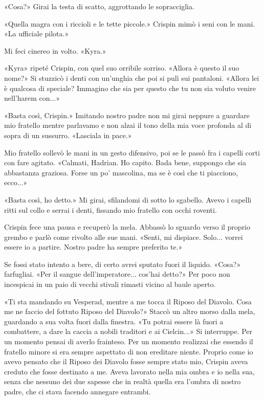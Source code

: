 «Cosa?» Girai la testa di scatto, aggrottando le sopracciglia.

«Quella magra con i riccioli e le tette piccole.» Crispin mimò i seni
con le mani. «La ufficiale pilota.»

Mi feci cinereo in volto. «Kyra.»

«Kyra» ripeté Crispin, con quel suo orribile sorriso. «Allora è questo
il suo nome?» Si stuzzicò i denti con un'unghia che poi si pulì sui
pantaloni. «Allora lei è qualcosa di speciale? Immagino che sia per
questo che tu non sia voluto venire nell'harem con...»

«Basta così, Crispin.» Imitando nostro padre non mi girai neppure a
guardare mio fratello mentre parlavamo e non alzai il tono della mia
voce profonda al di sopra di un sussurro. «Lasciala in pace.»

Mio fratello sollevò le mani in un gesto difensivo, poi se le passò fra
i capelli corti con fare agitato. «Calmati, Hadrian. Ho capito. Bada
bene, suppongo che sia abbastanza graziosa. Forse un po' mascolina, ma
se è così che ti piacciono, ecco...»

«Basta così, ho detto.» Mi girai, sfilandomi di sotto lo sgabello. Avevo
i capelli ritti sul collo e serrai i denti, fissando mio fratello con
occhi roventi.

Crispin fece una pausa e recuperò la mela. Abbassò lo sguardo verso il
proprio grembo e parlò come rivolto alle sue mani. «Senti, mi dispiace.
Solo... vorrei essere io a partire. Nostro padre ha sempre preferito
te.»

Se fossi stato intento a bere, di certo avrei sputato fuori il liquido.
«Cosa?» farfugliai. «Per il sangue dell'imperatore... cos'hai detto?»
Per poco non incespicai in un paio di vecchi stivali rimasti vicino al
baule aperto.

«Ti sta mandando su Vesperad, mentre a me tocca il Riposo del Diavolo.
Cosa me ne faccio del fottuto Riposo del Diavolo?» Staccò un altro morso
dalla mela, guardando a sua volta fuori dalla finestra. «Tu potrai
essere là fuori a combattere, a dare la caccia a nobili traditori e ai
Cielcin...» Si interruppe. Per un momento pensai di averlo frainteso.
Per un momento realizzai che essendo il fratello minore si era sempre
aspettato di non ereditare niente. Proprio come io avevo pensato che il
Riposo dei Diavolo fosse sempre stato mio, Crispin aveva creduto che
fosse destinato a me. Aveva lavorato nella mia ombra e io nella sua,
senza che nessuno dei due sapesse che in realtà quella era l'ombra di
nostro padre, che ci stava facendo annegare entrambi.

